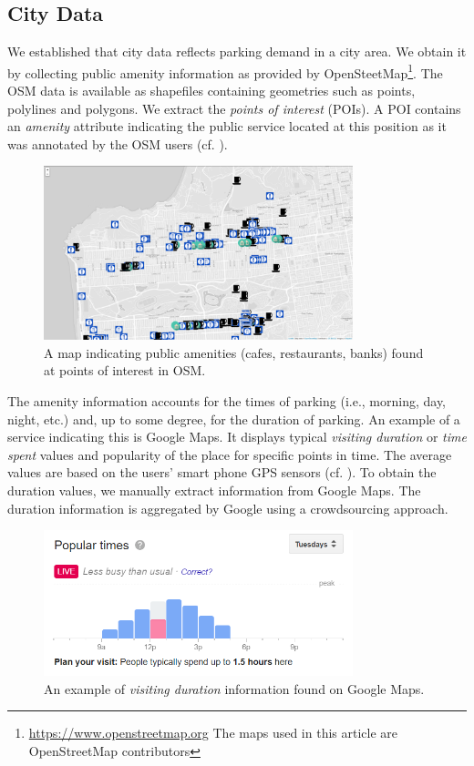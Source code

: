 \subsection{City Data}
\label{sec:citydata}
We established that city data reflects parking demand in a city area. We obtain it by collecting public amenity information as provided by OpenSteetMap\footnote{\url{https://www.openstreetmap.org} The maps used in this article are \textcopyright OpenStreetMap contributors}. The OSM data is available as shapefiles containing geometries such as points, polylines and polygons. We extract the \textit{points of interest} (POIs). A POI contains an \textit{amenity} attribute indicating the public service located at this position as it was annotated by the OSM users (cf. ).

\begin{figure}[!ht]
	\centering
	\includegraphics[width=0.8\textwidth]{graphics/cafes_restaurants_banks_larger.png}
	\caption{A map indicating public amenities (cafes, restaurants, banks) found at points of interest in OSM.}
	\label{fig:pois}
\end{figure}

The amenity information accounts for the times of parking (i.e., morning, day, night, etc.) and, up to some degree, for the duration of parking. An example of a service indicating this is Google Maps.
It displays typical \textit{visiting duration} or \textit{time spent} values and popularity of the place for specific points in time. The average values are based on the users' smart phone GPS sensors (cf. ). To obtain the duration values, we manually extract information from Google Maps. The duration information is aggregated by Google using a crowdsourcing approach. 

\begin{figure}[!ht]
	\centering
	\includegraphics[width=0.8\textwidth]{graphics/google_visit_duration.png}
	\caption{An example of \textit{visiting duration} information found on Google Maps.}
	\label{fig:visit_duration}
\end{figure}

